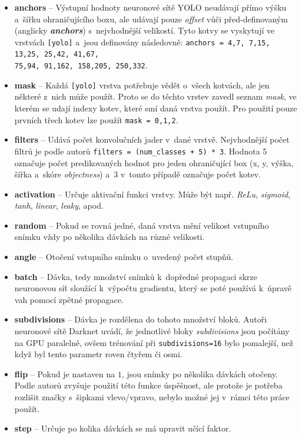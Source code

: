 \begin{itemize}
    \item \textbf{anchors} -- Výstupní hodnoty neuronové sítě YOLO neudávají přímo výšku a~šířku ohraničujícího boxu, ale udávají pouze \emph{offset} vůči před-definovaným  (anglicky \textbf{\emph{anchors}}) s~nejvhodnější velikostí. Tyto kotvy se vyskytují ve vrstvách \texttt{[yolo]} a~jsou definovány následovně: \texttt{anchors = 4,7, 7,15, 13,25,   25,42, 41,67,\\ 75,94, 91,162, 158,205, 250,332}.
    \item \textbf{mask} -- Každá \texttt{[yolo]} vrstva potřebuje vědět o~všech kotvách, ale jen některé z~nich může použít. Proto se do těchto vrstev zavedl seznam \emph{mask}, ve kterém se udají indexy kotev, které smí daná vrstva použít. Pro použití pouze prvních třech kotev lze použít \texttt{mask = 0,1,2}.
    \item \textbf{filters} -- Udává počet konvolučních jader v~dané vrstvě. Nejvhodnější počet filtrů je podle autorů \texttt{filters = (num\_classes + 5) * 3}. Hodnota 5 označuje počet predikovaných hodnot pro jeden ohraničující box (x, y, výška, šířka a~skóre \emph{objectness}) a~3 v~tomto případě označuje počet kotev.
    \item \textbf{activation} -- Určuje aktivační funkci vrstvy. Může být např. \emph{ReLu}, \emph{sigmoid}, \emph{tanh}, \emph{linear}, \emph{leaky}, apod.
    \item \textbf{random} -- Pokud se rovná jedné, daná vrstva mění velikost vstupního snímku vždy po několika dávkách na různé velikosti.
    \item \textbf{angle} -- Otočení vstupního snímku o~uvedený počet stupňů.
    \item \textbf{batch} -- Dávka, tedy množství snímků k~dopředné propagaci skrze neuronovou síť sloužící k~výpočtu gradientu, který se poté používá k~úpravě vah pomocí zpětné propagace.
    \item \textbf{subdivisions} -- Dávka je rozdělena do tohoto množství bloků. Autoři neuronové sítě Darknet uvádí, že jednotlivé bloky \emph{subdivisions} jsou počítány na GPU paralelně, ovšem trénování při \texttt{subdivisions=16} bylo pomalejší, než když byl tento parametr roven čtyřem či osmi.
    \item \textbf{flip} -- Pokud je nastaven na $1$, jsou snímky po několika dávkách otočeny. Podle autorů zvyšuje použití této funkce úspěšnost, ale protože je potřeba rozlišit značky s~šipkami vlevo/vpravo, nebylo možné jej v~rámci této práce použít.
    \item \textbf{step} -- Určuje po kolika dávkách se má upravit učící faktor.
\end{itemize}

